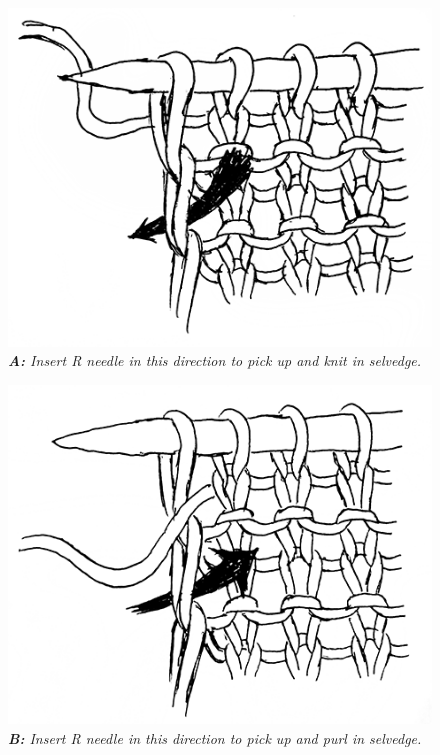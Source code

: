 \documentclass[12pt]{article}
\begin{document}
\begin{figure}
\vspace{1em}
\includegraphics[width=\linewidth]{punk.png}
\emph{\small \textbf{A:} Insert R needle in this direction to pick up and knit in selvedge.}

\vspace{2em}
\includegraphics[width=\linewidth]{punp.png}
\emph{\small \textbf{B:} Insert R needle in this direction to pick up and purl in selvedge.}
\vspace{-5em}
\end{figure} \leavevmode
\end{document}
